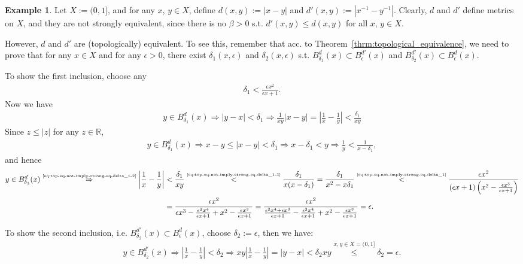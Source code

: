 \documentclass[12pt, a4paper]{article}
\numberwithin{equation}{section}
\theoremstyle{definition}
\theoremstyle{definition}
\newtheorem{exmp}[thm]{Example} %
\newcommand{\abs}[1]{\left\vert #1 \right\vert}
\begin{document}
		\begin{exmp}
			Let $X := (0, 1]$, and for any $x$, $y\in X$, define $d(x, y) := \abs{x - y}$ and \newline $d'(x, y) := \abs{x^{-1} - y^{-1}}$. Clearly, $d$ and $d'$ define metrics on $X$, and they are not strongly equivalent, since there is no $\beta > 0$ s.t. $d'(x, y) \leq d(x, y)$ for all $x$, $y\in X$. 
			
			However, $d$ and $d'$ are (topologically) equivalent. To see this, remember that acc. to \mbox{Theorem \ref{thrm:topological_equivalence}}, we need to prove that for any $x\in X$ and for any $\epsilon > 0$, there exist $\delta_{1}(x, \epsilon)$ and $\delta_2(x, \epsilon)$ s.t. $B_{\delta_1}^{d}(x) \subset B_{\epsilon}^{d'}(x)$ and $B_{\delta_2}^{d'}(x) \subset B_{\epsilon}^{d}(x)$. 
			
			To show the first inclusion, choose any
			\begin{align}\label{eq:top-eq-not-imply-strong-eq-delta_1}
				\delta_{1} < \frac{\epsilon x^2}{\epsilon x + 1}.
			\end{align}
			Now we have 
			\begin{align}\label{eq:top-eq-not-imply-strong-eq-delta_1-2}
				y \in B_{\delta_1}^{d}(x) \Rightarrow \abs{y - x} < \delta_1 \Rightarrow \frac{1}{xy}\abs{x - y} = \abs{\frac{1}{x} - \frac{1}{y}} < \frac{\delta_1}{xy}
			\end{align}
			Since $z \leq \abs{z}$ for any $z\in\mathbb R$, 
			\begin{align}\label{eq:top-eq-not-imply-strong-eq-delta_1-3}
				y \in B_{\delta_1}^{d}(x) \Rightarrow x - y \leq \abs{x-y} < \delta_1 \Rightarrow x - \delta_1 < y\Rightarrow \frac{1}{y} < \frac{1}{x - \delta_1},
			\end{align}
			and hence 
			\begin{align}
				y \in B_{\delta_1}^{d}(x) \overset{\tiny \eqref{eq:top-eq-not-imply-strong-eq-delta_1-2}}{\Rightarrow} \abs{\frac{1}{x} - \frac{1}{y}} &< \frac{\delta_1}{xy} \overset{\tiny \eqref{eq:top-eq-not-imply-strong-eq-delta_1-3}}{<} \frac{\delta_1}{x(x - \delta_1)} = \frac{\delta_1}{x^2 - x\delta_1} \overset{\tiny \eqref{eq:top-eq-not-imply-strong-eq-delta_1}}{<} \frac{\epsilon x^2}{\left(\epsilon x + 1\right)\left(x^2 - \frac{\epsilon x^3}{\epsilon x + 1}\right)} 
				\\ &= \frac{\epsilon x^2}{\epsilon x^3 - \frac{\epsilon^2 x^4}{\epsilon x + 1} + x^2 - \frac{\epsilon x^3}{\epsilon x + 1}} = \frac{\epsilon x^2}{\frac{\epsilon^2 x^4 + \epsilon x^3}{\epsilon x + 1} - \frac{\epsilon^2 x^4}{\epsilon x + 1} + x^2 - \frac{\epsilon x^3}{\epsilon x + 1}} = \epsilon.
			\end{align}
			
			To show the second inclusion, i.e. $B_{\delta_2}^{d'}(x) \subset B_{\epsilon}^{d}(x)$, choose $\delta_2 := \epsilon$, then we have:
			\begin{align}
				y \in B_{\delta_2}^{d'}(x) \Rightarrow \abs{\frac{1}{x} - \frac{1}{y}} < \delta_2 \Rightarrow xy\abs{\frac{1}{x} - \frac{1}{y}} = \abs{y - x} < \delta_2 xy \overset{x, y\in X = (0, 1]}{\leq} \delta_2 = \epsilon.
			\end{align}
		\end{exmp}
		
\end{document}
